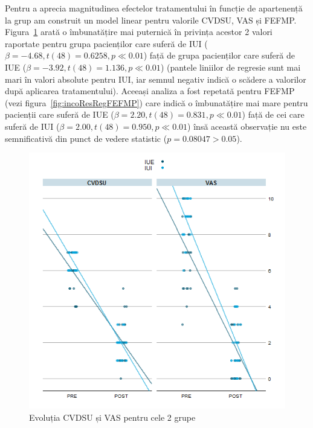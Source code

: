 \documentclass[12pt,draft]{article}
\begin{document}
Pentru a aprecia magnitudinea efectelor tratamentului în funcție de apartenență la grup am construit un model linear pentru valorile \ac{CVDSU}, \ac{VAS} și \ac{FEFMP}. Figura~\ref{fig:incoResRegGrp} arată o îmbunatățire mai puternică în privința acestor 2 valori raportate pentru grupa pacienților care suferă de \ac{IUI} ($\beta=-4.68, t(48)=0.6258, p\ll0.01$) față de grupa pacienților care suferă de \ac{IUE} ($\beta=-3.92, t(48)=1.136, p\ll0.01$) (pantele liniilor de regresie sunt mai mari în valori absolute pentru \ac{IUI}, iar semnul negativ indică o scădere a valorilor după aplicarea tratamentului). Aceeași analiza a fost repetată pentru \ac{FEFMP} (vezi figura~\ref{fig:incoResRegFEFMP}) care indică o îmbunatățire mai mare pentru pacienții care suferă de \ac{IUE} ($\beta=2.20, t(48)=0.831, p\ll0.01$) față de cei care suferă de \ac{IUI} ($\beta=2.00, t(48)=0.950, p\ll0.01$) însă această observație nu este semnificativă din punct de vedere statistic ($p=0.08047>0.05$).
  \begin{figure}[H]
    \centering
    \includegraphics[width=0.8\linewidth]{incoResRegGrp}
    \caption{Evoluția \acf{CVDSU} și \acf{VAS} pentru cele 2 grupe}
    \label{fig:incoResRegGrp}
  \end{figure}
\end{document}
